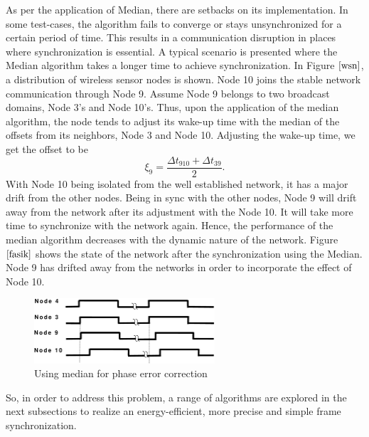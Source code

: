 \documentclass[a4paper,10pt]{report}
\begin{document}
\newline As per the application of Median, there are setbacks on its implementation. In some test-cases, the algorithm fails to converge or stays unsynchronized for a certain period of time. This results in a  communication disruption in places where synchronization is essential.
\newline A typical scenario is presented where the Median algorithm takes a longer time to achieve synchronization. In Figure
$\ref{wsn}$, a distribution of wireless sensor nodes is shown. Node 10 joins the stable network communication through Node 9. Assume Node
9 belongs to two broadcast domains, Node 3's and Node 10's. Thus, upon the application of the median algorithm, the node tends to
adjust its wake-up time with the median of the offsets from its neighbors, Node 3 and Node 10. Adjusting the wake-up time, we get
the offset to be 
\begin{equation}
\xi_9 = \frac{\Delta t_{910} + \Delta t_{39}}{2}.
\end{equation}
With Node 10 being isolated from the well established network, it has a major drift from the other nodes. Being in sync
with the other nodes, Node 9 will drift away from the network after its adjustment with the Node 10. It will take more time to
synchronize with the network again. Hence, the performance of the median algorithm decreases with the dynamic nature of the network.
Figure $\ref{fasik}$ shows the state of the network after the synchronization using the Median. Node 9 has drifted away from the
networks in order to incorporate the effect of Node 10.
\begin{figure}
\centering
\includegraphics[width= 0.6\textwidth]{offsetpic}
\caption{Using median for phase error correction} \label{fasik}
\end{figure}
\newline 
So, in order to address this problem, a range of algorithms are explored in the next subsections to realize an
energy-efficient, more precise and simple frame synchronization.\newline
\end{document}
